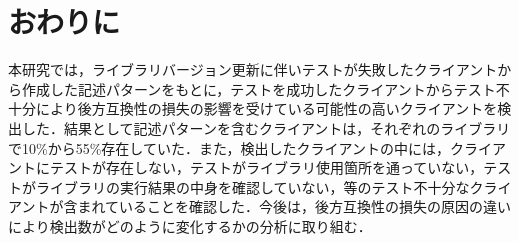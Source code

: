 \documentclass[T,J]{fose} %
\begin{document}




\section{おわりに}\label{sec:conclusion}
本研究では，ライブラリバージョン更新に伴いテストが失敗したクライアントから作成した記述パターンをもとに，テストを成功したクライアントからテスト不十分により後方互換性の損失の影響を受けている可能性の高いクライアントを検出した．結果として記述パターンを含むクライアントは，それぞれのライブラリで10\%から55\%存在していた．また，検出したクライアントの中には，クライアントにテストが存在しない，テストがライブラリ使用箇所を通っていない，テストがライブラリの実行結果の中身を確認していない，等のテスト不十分なクライアントが含まれていることを確認した．今後は，後方互換性の損失の原因の違いにより検出数がどのように変化するかの分析に取り組む．
\end{document}
